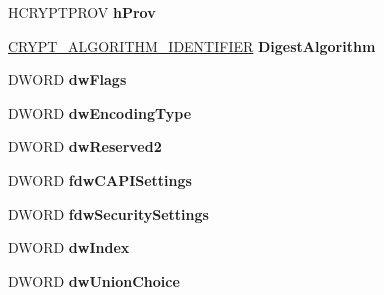 \begin{DoxyCompactItemize}
\item 
\mbox{\label{struct_s_i_p___s_u_b_j_e_c_t_i_n_f_o___acc9c774969f55a20de1efef4a129c665}} 
H\+C\+R\+Y\+P\+T\+P\+R\+OV {\bfseries h\+Prov}
\item 
\mbox{\label{struct_s_i_p___s_u_b_j_e_c_t_i_n_f_o___a0b2f93781aed210d3d7a2b8984422d0d}} 
\hyperlink{struct___c_r_y_p_t___a_l_g_o_r_i_t_h_m___i_d_e_n_t_i_f_i_e_r}{C\+R\+Y\+P\+T\+\_\+\+A\+L\+G\+O\+R\+I\+T\+H\+M\+\_\+\+I\+D\+E\+N\+T\+I\+F\+I\+ER} {\bfseries Digest\+Algorithm}
\item 
\mbox{\label{struct_s_i_p___s_u_b_j_e_c_t_i_n_f_o___ad7176d23d6b866914d5d89598306e782}} 
D\+W\+O\+RD {\bfseries dw\+Flags}
\item 
\mbox{\label{struct_s_i_p___s_u_b_j_e_c_t_i_n_f_o___a3e488c7ab8f0932f440c7d87b263455b}} 
D\+W\+O\+RD {\bfseries dw\+Encoding\+Type}
\item 
\mbox{\label{struct_s_i_p___s_u_b_j_e_c_t_i_n_f_o___a4f743bbe177cacb2d51d452085994307}} 
D\+W\+O\+RD {\bfseries dw\+Reserved2}
\item 
\mbox{\label{struct_s_i_p___s_u_b_j_e_c_t_i_n_f_o___a7c47ac6c27996d2c58e85d7c37a38f39}} 
D\+W\+O\+RD {\bfseries fdw\+C\+A\+P\+I\+Settings}
\item 
\mbox{\label{struct_s_i_p___s_u_b_j_e_c_t_i_n_f_o___af06136d83dd5582cf37b6b85a43d5697}} 
D\+W\+O\+RD {\bfseries fdw\+Security\+Settings}
\item 
\mbox{\label{struct_s_i_p___s_u_b_j_e_c_t_i_n_f_o___a019e2496b5830e6ab0c7bfffb86b2f52}} 
D\+W\+O\+RD {\bfseries dw\+Index}
\item 
\mbox{\label{struct_s_i_p___s_u_b_j_e_c_t_i_n_f_o___a5567d662111f682541589cc291ed573a}} 
D\+W\+O\+RD {\bfseries dw\+Union\+Choice}
\item 
\mbox{\label{struct_s_i_p___s_u_b_j_e_c_t_i_n_f_o___a23e704e45ca38e311aaae7971209aa1f}} 

\end{DoxyCompactItemize}
